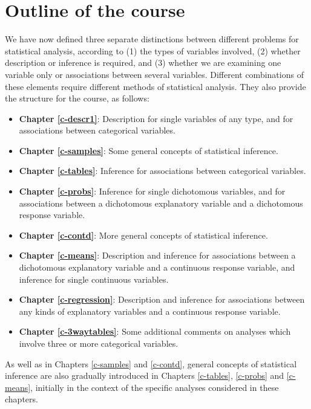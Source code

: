 \documentclass[11pt,a4paper,openany]{book}
\begin{document}
\section{Outline of the course}\label{s-intro-outline}

We have now defined three separate distinctions between different
problems for statistical analysis, according to (1) the types of
variables involved, (2) whether description or inference is required,
and (3) whether we are examining one variable only or associations
between several variables. Different combinations of these elements
require different methods of statistical analysis. They also provide the
structure for the course, as follows:

\begin{itemize}
\item
  \textbf{Chapter \ref{c-descr1}}: Description for single variables of
  any type, and for associations between categorical variables.
\item
  \textbf{Chapter \ref{c-samples}}: Some general concepts of statistical
  inference.
\item
  \textbf{Chapter \ref{c-tables}}: Inference for associations between
  categorical variables.
\item
  \textbf{Chapter \ref{c-probs}}: Inference for single dichotomous
  variables, and for associations between a dichotomous explanatory
  variable and a dichotomous response variable.
\item
  \textbf{Chapter \ref{c-contd}}: More general concepts of statistical
  inference.
\item
  \textbf{Chapter \ref{c-means}}: Description and inference for
  associations between a dichotomous explanatory variable and a
  continuous response variable, and inference for single continuous
  variables.
\item
  \textbf{Chapter \ref{c-regression}}: Description and inference for
  associations between any kinds of explanatory variables and a
  continuous response variable.
\item
  \textbf{Chapter \ref{c-3waytables}}: Some additional comments on
  analyses which involve three or more categorical variables.
\end{itemize}

As well as in Chapters \ref{c-samples} and \ref{c-contd}, general
concepts of statistical inference are also gradually introduced in
Chapters \ref{c-tables}, \ref{c-probs} and \ref{c-means}, initially in
the context of the specific analyses considered in these chapters.
\end{document}
